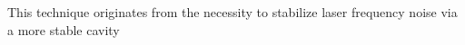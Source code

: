 
This technique originates from the necessity to stabilize laser frequency noise via a more stable cavity 
